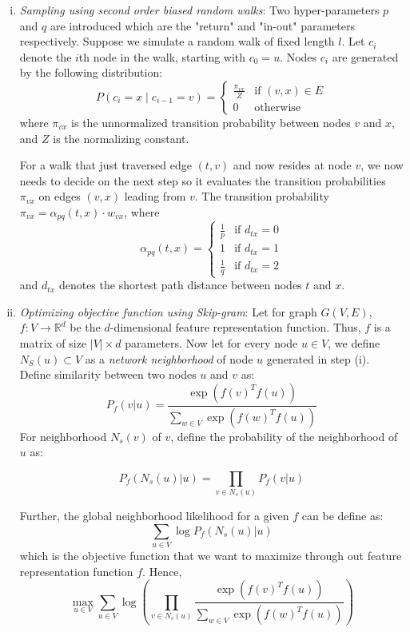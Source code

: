 \begin{enumerate}[(i)]
    \item \textit{Sampling using second order biased random walks}: Two hyper-parameters \( p \) and \( q \) are introduced which are the "return" and "in-out" parameters respectively. Suppose we simulate a random walk of fixed length \( l \). Let \( c_i \) denote the \( i \)th node in the walk, starting with \( c_0 = u \). Nodes \( c_i \) are generated by the following distribution:
    \[
        P(c_i = x \mid c_{i-1} = v) =
        \begin{cases}
        \frac{\pi_{vx}}{Z} & \text{if } (v,x) \in E \\
        0 & \text{otherwise}
        \end{cases}
    \]
    where \( \pi_{vx} \) is the unnormalized transition probability between nodes \( v \) and \( x \), and \( Z \) is the normalizing constant.
    
    For a walk that just traversed edge \( (t,v) \) and now resides at node \( v \), we now needs to decide on the next step so it evaluates the transition probabilities \( \pi_{vx} \) on edges \( (v,x) \) leading from \( v \). The transition probability \( \pi_{vx} = \alpha_{pq}(t,x)\cdot w_{vx} \), where 
    \[
        \alpha_{pq}(t,x) = 
        \begin{cases}
        \frac{1}{p}  & \text{if } d_{tx} = 0\\
        1 & \text{if } d_{tx} = 1\\
        \frac{1}{q} & \text{if } d_{tx} = 2
        \end{cases}
    \]
    and \( d_{tx} \) denotes the shortest path distance between nodes \( t \) and \( x \).

    \item \textit{Optimizing objective function using Skip-gram}: Let for graph \( G(V, E) \), \( f: V \rightarrow \mathbb{R}^d \) be the \( d \)-dimensional feature representation function. Thus, \( f \) is a matrix of size \( |V| \times d \) parameters. Now let for every node \( u \in V \), we define \( N_S(u) \subset V \) as a \emph{network neighborhood} of node \( u \) generated in step (i). Define similarity between two nodes \( u \) and \( v \) as:
    \[
        P_f(v|u) = \frac{\exp(f(v)^T f(u))}{\sum_{w \in V} \exp(f(w)^T f(u))} \tag{1}
    \]
    For neighborhood \( N_s(v) \) of \( v \), define the probability of the neighborhood of \( u \) as:
    
    \[ P_f(N_s(u)|u) = \prod_{v \in N_s(u)} P_f(v|u) \tag{2} \]

    Further, the global neighborhood likelihood for a given \( f \) can be define as:
    \[ \sum_{u \in V} \log P_f(N_s(u)|u) \tag{3}\]
    which is the objective function that we want to maximize through out feature representation function \(f\). Hence,
     \[
    \max_{u \in V} \sum_{u \in V} \log \left( \prod_{v \in N_s(u)} \frac{\exp(f(v)^T f(u))}{\sum_{w \in V} \exp(f(w)^T f(u))} \right) \tag{4}
    \]
\end{enumerate}

